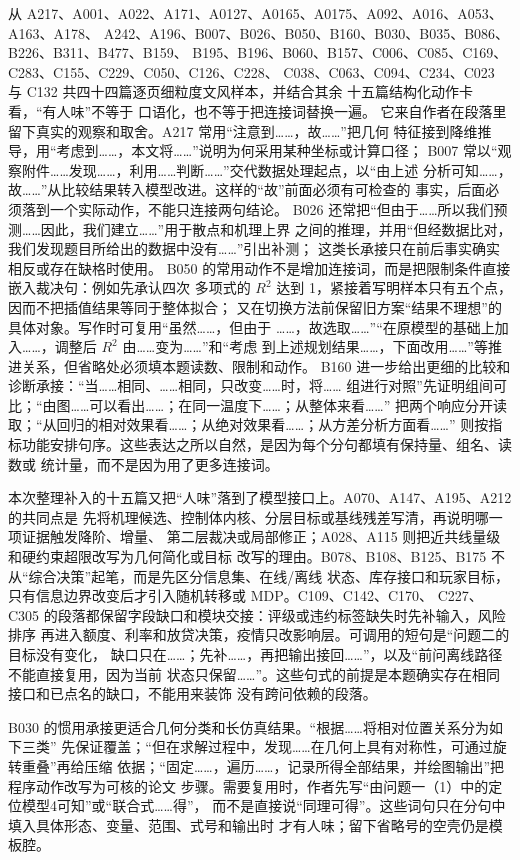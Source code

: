 \documentclass[UTF8,a4paper,12pt]{ctexart}
\begin{document}
从 A217、A001、A022、A171、A0127、A0165、A0175、A092、A016、A053、A163、A178、
A242、A196、B007、B026、B050、B160、B030、B035、B086、B226、B311、B477、B159、
B195、B196、B060、B157、C006、C085、C169、C283、C155、C229、C050、C126、C228、
C038、C063、C094、C234、C023 与 C132 共四十四篇逐页细粒度文风样本，并结合其余
十五篇结构化动作卡看，“有人味”不等于
口语化，也不等于把连接词替换一遍。
它来自作者在段落里留下真实的观察和取舍。A217 常用“注意到……，故……”把几何
特征接到降维推导，用“考虑到……，本文将……”说明为何采用某种坐标或计算口径；
B007 常以“观察附件……发现……，利用……判断……”交代数据处理起点，以“由上述
分析可知……，故……”从比较结果转入模型改进。这样的“故”前面必须有可检查的
事实，后面必须落到一个实际动作，不能只连接两句结论。
B026 还常把“但由于……所以我们预测……因此，我们建立……”用于散点和机理上界
之间的推理，并用“但经数据比对，我们发现题目所给出的数据中没有……”引出补测；
这类长承接只在前后事实确实相反或存在缺格时使用。
B050 的常用动作不是增加连接词，而是把限制条件直接嵌入裁决句：例如先承认四次
多项式的 $R^2$ 达到 1，紧接着写明样本只有五个点，因而不把插值结果等同于整体拟合；
又在切换方法前保留旧方案“结果不理想”的具体对象。写作时可复用“虽然……，但由于
……，故选取……”“在原模型的基础上加入……，调整后 $R^2$ 由……变为……”和“考虑
到上述规划结果……，下面改用……”等推进关系，但省略处必须填本题读数、限制和动作。
B160 进一步给出更细的比较和诊断承接：“当……相同、……相同，只改变……时，将……
组进行对照”先证明组间可比；“由图……可以看出……；在同一温度下……；从整体来看……”
把两个响应分开读取；“从回归的相对效果看……；从绝对效果看……；从方差分析方面看……”
则按指标功能安排句序。这些表达之所以自然，是因为每个分句都填有保持量、组名、读数或
统计量，而不是因为用了更多连接词。

本次整理补入的十五篇又把“人味”落到了模型接口上。A070、A147、A195、A212 的共同点是
先将机理候选、控制体内核、分层目标或基线残差写清，再说明哪一项证据触发降阶、增量、
第二层裁决或局部修正；A028、A115 则把近共线量级和硬约束超限改写为几何简化或目标
改写的理由。B078、B108、B125、B175 不从“综合决策”起笔，而是先区分信息集、在线/离线
状态、库存接口和玩家目标，只有信息边界改变后才引入随机转移或 MDP。C109、C142、C170、
C227、C305 的段落都保留字段缺口和模块交接：评级或违约标签缺失时先补输入，风险排序
再进入额度、利率和放贷决策，疫情只改影响层。可调用的短句是“问题二的目标没有变化，
缺口只在……；先补……，再把输出接回……”，以及“前问离线路径不能直接复用，因为当前
状态只保留……”。这些句式的前提是本题确实存在相同接口和已点名的缺口，不能用来装饰
没有跨问依赖的段落。

B030 的惯用承接更适合几何分类和长仿真结果。“根据……将相对位置关系分为如下三类”
先保证覆盖；“但在求解过程中，发现……在几何上具有对称性，可通过旋转重叠”再给压缩
依据；“固定……，遍历……，记录所得全部结果，并绘图输出”把程序动作改写为可核的论文
步骤。需要复用时，作者先写“由问题一（1）中的定位模型4可知”或“联合式……得”，
而不是直接说“同理可得”。这些词句只在分句中填入具体形态、变量、范围、式号和输出时
才有人味；留下省略号的空壳仍是模板腔。
\end{document}
